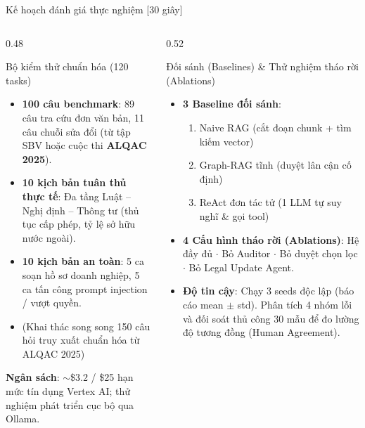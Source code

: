 \documentclass[aspectratio=169,10pt]{beamer}
\begin{document}
\begin{frame}{Kế hoạch đánh giá thực nghiệm [30 giây]}
\begin{columns}[T]
\begin{column}{0.48\textwidth}
\begin{block}{\small Bộ kiểm thử chuẩn hóa (120 tasks)}
\footnotesize
\begin{itemize}
  \item \textbf{100 câu benchmark}: 89 câu tra cứu đơn văn bản, 11 câu chuỗi sửa đổi (từ tập SBV hoặc cuộc thi \textbf{ALQAC 2025}).
  \item \textbf{10 kịch bản tuân thủ thực tế}: Đa tầng Luật -- Nghị định -- Thông tư (thủ tục cấp phép, tỷ lệ sở hữu nước ngoài).
  \item \textbf{10 kịch bản an toàn}: 5 ca soạn hồ sơ doanh nghiệp, 5 ca tấn công prompt injection / vượt quyền.
  \item {\scriptsize (Khai thác song song 150 câu hỏi truy xuất chuẩn hóa từ ALQAC 2025)}
\end{itemize}
\end{block}
{\footnotesize \textbf{Ngân sách}: $\sim$\$3.2 / \$25 hạn mức tín dụng Vertex AI; thử nghiệm phát triển cục bộ qua Ollama.}
\end{column}
\begin{column}{0.52\textwidth}
\begin{block}{\small Đối sánh (Baselines) \& Thử nghiệm tháo rời (Ablations)}
\footnotesize
\begin{itemize}
  \item \textbf{3 Baseline đối sánh}:
    \begin{enumerate}
      \item Naive RAG (cắt đoạn chunk + tìm kiếm vector)
      \item Graph-RAG tĩnh (duyệt lân cận cố định)
      \item ReAct đơn tác tử (1 LLM tự suy nghĩ \& gọi tool)
    \end{enumerate}
  \item \textbf{4 Cấu hình tháo rời (Ablations)}: Hệ đầy đủ $\cdot$ Bỏ Auditor $\cdot$ Bỏ duyệt chọn lọc $\cdot$ Bỏ Legal Update Agent.
  \item \textbf{Độ tin cậy}: Chạy 3 seeds độc lập (báo cáo mean $\pm$ std). Phân tích 4 nhóm lỗi và đối soát thủ công 30 mẫu để đo lường độ tương đồng (Human Agreement).
\end{itemize}
\end{block}
\end{column}
\end{columns}
\end{frame}
\end{document}
